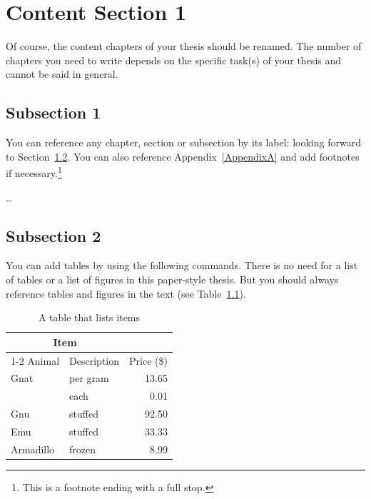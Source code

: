 \chapter{Content Section 1} %
\label{ch:section1}

Of course, the content chapters of your thesis should be renamed. The number of chapters you need to write depends on the specific task(s) of your thesis and cannot be said in general.


\section{Subsection 1}
\label{ch:section1:sec:subsection1}

You can reference any chapter, section or subsection by its label: looking forward to Section~\ref{ch:section1:sec:subsection2}. You can also reference Appendix~\ref{AppendixA} and add footnotes if necessary.\footnote{This is a footnote ending with a full stop.} 

\dots

\section{Subsection 2}
\label{ch:section1:sec:subsection2}
You can add tables by using the following commands. There is no need for a list of tables or a list of figures in this paper-style thesis. But you should always reference tables and figures in the text (see Table~\ref{tab:prices}). 
\begin{table}[htb]%
	\centering
	\begin{tabular}{llr}
		\toprule
		\multicolumn{2}{c}{Item} \\
		\cmidrule(r){1-2}
		Animal    & Description & Price (\$) \\
		\midrule
		Gnat      & per gram    & 13.65      \\
		& each        & 0.01       \\
		Gnu       & stuffed     & 92.50      \\
		Emu       & stuffed     & 33.33      \\
		Armadillo & frozen      & 8.99       \\
		\bottomrule
	\end{tabular}
	\caption{A table that lists items \cite{Becker2009}}
	\label{tab:prices}
\end{table}


